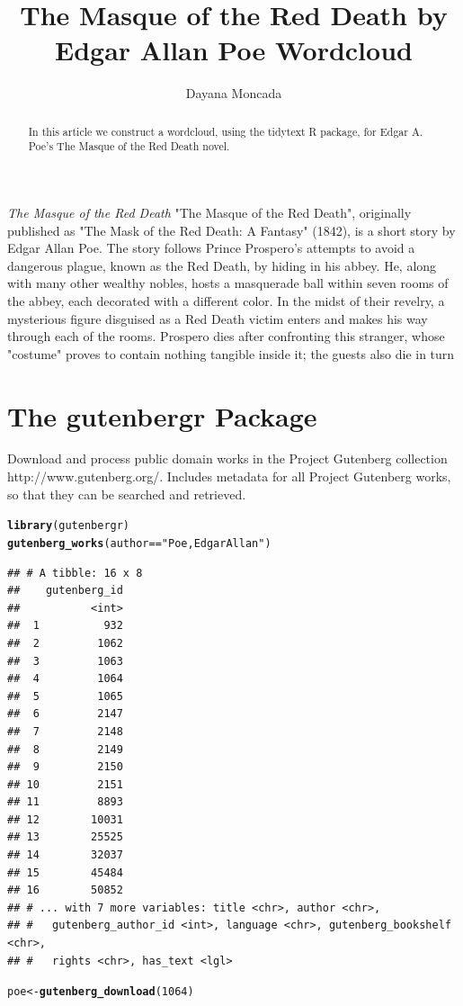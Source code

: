 \documentclass{article}\usepackage[]{graphicx}\usepackage[]{color}
\makeatletter
\newcommand{\hlnum}[1]{\textcolor[rgb]{0.686,0.059,0.569}{#1}}%
\newcommand{\hlstr}[1]{\textcolor[rgb]{0.192,0.494,0.8}{#1}}%
\newcommand{\hlopt}[1]{\textcolor[rgb]{0,0,0}{#1}}%
\newcommand{\hlstd}[1]{\textcolor[rgb]{0.345,0.345,0.345}{#1}}%
\newcommand{\hlkwb}[1]{\textcolor[rgb]{0.69,0.353,0.396}{#1}}%
\newcommand{\hlkwd}[1]{\textcolor[rgb]{0.737,0.353,0.396}{\textbf{#1}}}%
\newenvironment{kframe}{%
 \def\at@end@of@kframe{}%
 \ifinner\ifhmode%
  \def\at@end@of@kframe{\end{minipage}}%
  \begin{minipage}{\columnwidth}%
 \fi\fi%
 \def\FrameCommand##1{\hskip\@totalleftmargin \hskip-\fboxsep
 \colorbox{shadecolor}{##1}\hskip-\fboxsep
     \hskip-\linewidth \hskip-\@totalleftmargin \hskip\columnwidth}%
 \MakeFramed {\advance\hsize-\width
   \@totalleftmargin\z@ \linewidth\hsize
   \@setminipage}}%
 {\par\unskip\endMakeFramed%
 \at@end@of@kframe}
\newenvironment{knitrout}{}{} %
\makeatother
\begin{document}
\title{The Masque of the Red Death by Edgar Allan Poe Wordcloud}
\author{Dayana Moncada}
\maketitle

\begin{abstract}
In this article we construct a wordcloud, using the tidytext R package, for Edgar A. Poe's The Masque of the Red Death novel. 

\end{abstract}

\textit{The Masque of the Red Death} 
"The Masque of the Red Death", originally published as "The Mask of the Red Death: A Fantasy" (1842), is a short story by Edgar Allan Poe. The story follows Prince Prospero's attempts to avoid a dangerous plague, known as the Red Death, by hiding in his abbey. He, along with many other wealthy nobles, hosts a masquerade ball within seven rooms of the abbey, each decorated with a different color. In the midst of their revelry, a mysterious figure disguised as a Red Death victim enters and makes his way through each of the rooms. Prospero dies after confronting this stranger, whose "costume" proves to contain nothing tangible inside it; the guests also die in turn

\section{The gutenbergr Package} 
Download and process public domain works in the Project Gutenberg collection http://www.gutenberg.org/. Includes metadata for all Project Gutenberg works, so that they can be searched and retrieved.

\begin{knitrout}
\color{fgcolor}\begin{kframe}
\begin{alltt}
\hlkwd{library}\hlstd{(gutenbergr)}
\hlkwd{gutenberg_works}\hlstd{(author} \hlopt{==} \hlstr{"Poe, Edgar Allan"}\hlstd{)}
\end{alltt}
\begin{verbatim}
## # A tibble: 16 x 8
##    gutenberg_id
##           <int>
##  1          932
##  2         1062
##  3         1063
##  4         1064
##  5         1065
##  6         2147
##  7         2148
##  8         2149
##  9         2150
## 10         2151
## 11         8893
## 12        10031
## 13        25525
## 14        32037
## 15        45484
## 16        50852
## # ... with 7 more variables: title <chr>, author <chr>,
## #   gutenberg_author_id <int>, language <chr>, gutenberg_bookshelf <chr>,
## #   rights <chr>, has_text <lgl>
\end{verbatim}
\begin{alltt}
\hlstd{poe}\hlkwb{<-}\hlkwd{gutenberg_download}\hlstd{(}\hlnum{1064}\hlstd{)}
\end{alltt}
\end{kframe}
\end{knitrout}
\end{document}
